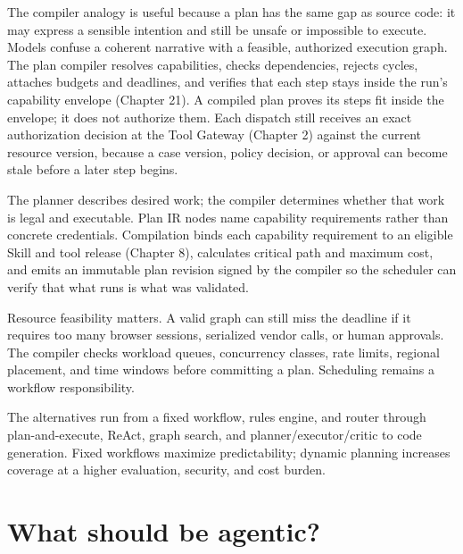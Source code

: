 The compiler analogy is useful because a plan has the same gap as source code: it may express a sensible intention and still be unsafe or impossible to execute. Models confuse a coherent narrative with a feasible, authorized execution graph. The plan compiler resolves capabilities, checks dependencies, rejects cycles, attaches budgets and deadlines, and verifies that each step stays inside the run's capability envelope (Chapter 21). A compiled plan proves its steps fit inside the envelope; it does not authorize them. Each dispatch still receives an exact authorization decision at the Tool Gateway (Chapter 2) against the current resource version, because a case version, policy decision, or approval can become stale before a later step begins.\par


The planner describes desired work; the compiler determines whether that work is legal and executable. Plan IR nodes name capability requirements rather than concrete credentials. Compilation binds each capability requirement to an eligible Skill and tool release (Chapter 8), calculates critical path and maximum cost, and emits an immutable plan revision signed by the compiler so the scheduler can verify that what runs is what was validated.\par

Resource feasibility matters. A valid graph can still miss the deadline if it requires too many browser sessions, serialized vendor calls, or human approvals. The compiler checks workload queues, concurrency classes, rate limits, regional placement, and time windows before committing a plan. Scheduling remains a workflow responsibility.\par

The alternatives run from a fixed workflow, rules engine, and router through plan-and-execute, ReAct, graph search, and planner/executor/critic to code generation. Fixed workflows maximize predictability; dynamic planning increases coverage at a higher evaluation, security, and cost burden.\par

\section{What should be agentic?}

